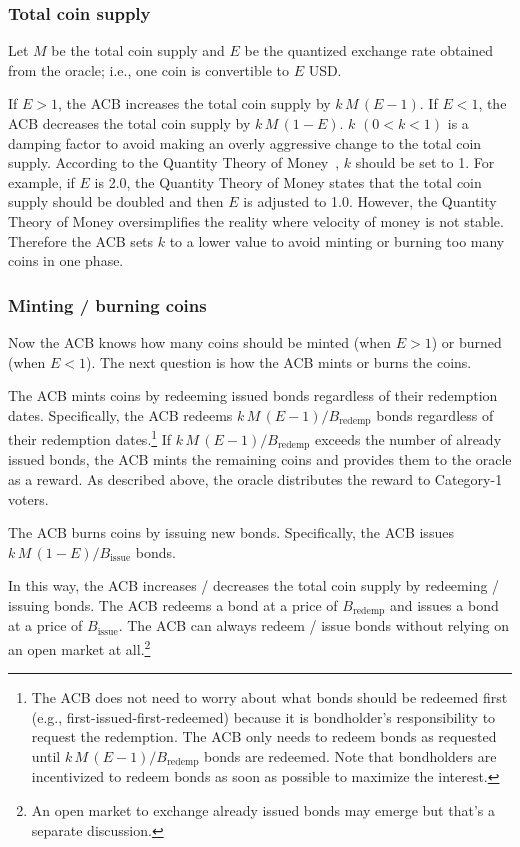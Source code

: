 \documentclass[dvipdfmx,a4paper]{article}
\begin{document}
\subsubsection{Total coin supply}

Let $M$ be the total coin supply and $E$ be the quantized exchange rate obtained from the oracle; i.e., one coin is convertible to $E$ USD.

If $E>1$, the ACB increases the total coin supply by $k\,M\,(E-1)$. If $E<1$, the ACB decreases the total coin supply by $k\,M\,(1-E)$. $k$ $(0<k<1)$ is a damping factor to avoid making an overly aggressive change to the total coin supply. According to the Quantity Theory of Money~\cite{mankiwmacro}, $k$ should be set to 1. For example, if $E$ is 2.0, the Quantity Theory of Money states that the total coin supply should be doubled and then $E$ is adjusted to 1.0. However, the Quantity Theory of Money oversimplifies the reality where velocity of money is not stable. Therefore the ACB sets $k$ to a lower value to avoid minting or burning too many coins in one phase.

\subsubsection{Minting / burning coins}

Now the ACB knows how many coins should be minted (when $E>1$) or burned (when $E<1$). The next question is how the ACB mints or burns the coins.

The ACB mints coins by redeeming issued bonds regardless of their redemption dates. Specifically, the ACB redeems $k\,M\,(E-1)/B_{\mathrm{redemp}}$ bonds regardless of their redemption dates.\footnote{The ACB does not need to worry about what bonds should be redeemed first (e.g., first-issued-first-redeemed) because it is bondholder's responsibility to request the redemption. The ACB only needs to redeem bonds as requested until $k\,M\,(E-1)/B_{\mathrm{redemp}}$ bonds are redeemed. Note that bondholders are incentivized to redeem bonds as soon as possible to maximize the interest.} If $k\,M\,(E-1)/B_{\mathrm{redemp}}$ exceeds the number of already issued bonds, the ACB mints the remaining coins and provides them to the oracle as a reward. As described above, the oracle distributes the reward to Category-1 voters.

The ACB burns coins by issuing new bonds. Specifically, the ACB issues $k\,M\,(1-E)/B_{\mathrm{issue}}$ bonds.

In this way, the ACB increases / decreases the total coin supply by redeeming / issuing bonds. The ACB redeems a bond at a price of $B_{\mathrm{redemp}}$ and issues a bond at a price of $B_{\mathrm{issue}}$. The ACB can always redeem / issue bonds without relying on an open market at all.\footnote{An open market to exchange already issued bonds may emerge but that's a separate discussion.}
\end{document}
